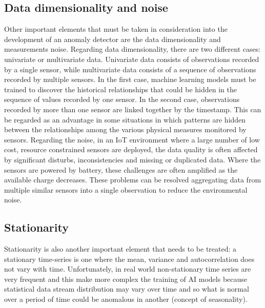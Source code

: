 \subsection{Data dimensionality and noise}
Other important elements that must be taken in consideration into the development of an anomaly detector are the data dimensionality and measurements noise. Regarding data dimensionality, there are two different cases: univariate or multivariate data. Univariate data consists of observations recorded by a single sensor, while multivariate data consists of a sequence of observations recorded by multiple sensors. In the first case, machine learning models must be trained to discover the historical relationships that could be hidden in the sequence of values recorded by one sensor. In the second case, observations recorded by more than one sensor are linked together by the timestamp. This can be regarded as an advantage in some situations in which patterns are hidden between the relationships among the various physical measures monitored by sensors. Regarding the noise, in an IoT environment where a large number of low cost, resource constrained sensors are deployed, the data quality is often affected by significant disturbs, inconsistencies and missing or duplicated data. Where the sensors are powered by battery, these challenges are often amplified as the available charge decreases. These problems can be resolved aggregating data from multiple similar sensors into a single observation to reduce the environmental noise.
\subsection{Stationarity}
Stationarity is also another important element that needs to be treated: a stationary time-series is one where the mean, variance and autocorrelation does not vary with time. Unfortunately, in real world non-stationary time series are very frequent and this make more complex the training of AI models because statistical data stream distribution may vary over time and so what is normal over a period of time could be anomalous in another (concept of seasonality).
